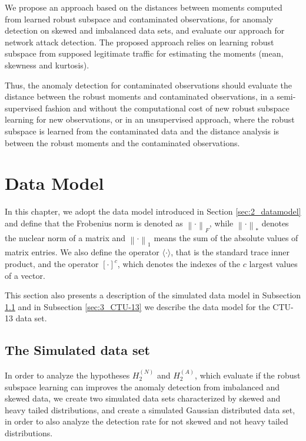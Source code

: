 We propose an approach based on the distances between moments computed from learned robust subspace and contaminated observations, for anomaly detection on skewed and imbalanced data sets, and evaluate our approach for network attack detection. The proposed approach relies on learning robust subspace from supposed legitimate traffic for estimating the moments (mean, skewness and kurtosis). 

Thus, the anomaly detection for contaminated observations should evaluate the distance between the robust moments and contaminated observations, in a semi-supervised fashion and without the computational cost of new robust subspace learning for new observations, or in an unsupervised approach, where the robust subspace is learned from the contaminated data and the distance analysis is between the robust moments and the contaminated observations.


\section{Data Model}
\label{sec:3_datamodel}

In this chapter, we adopt the data model introduced in Section \ref{sec:2_datamodel} and define that the Frobenius norm is denoted as $\left\| \mathord{\cdot} \right\|_F$, while $\left\| \mathord{\cdot} \right\|_*$ denotes the nuclear norm of a matrix and $\left\| \mathord{\cdot} \right\|_1$ means the sum of the absolute values of matrix entries. We also define the operator $\langle \mathord{\cdot} \rangle$, that is the standard trace inner product, and the operator $[ \mathord{\cdot} ]^c$, which denotes the indexes of the $c$ largest values of a vector.

This section also presents a description of the simulated data model in Subsection \ref{sec:3_simulation} and in Subsection \ref{sec:3_CTU-13} we describe the data model for the CTU-13 data set.


\subsection{The Simulated data set}
\label{sec:3_simulation}

In order to analyze the hypotheses $H_2^{(N)}$ and $H_2^{(A)}$, which evaluate if the robust subspace learning can improves the anomaly detection from imbalanced and skewed data, we create two simulated data sets characterized by skewed and heavy tailed distributions, and create a simulated Gaussian distributed data set, in order to also analyze the detection rate for not skewed and not heavy tailed distributions.

